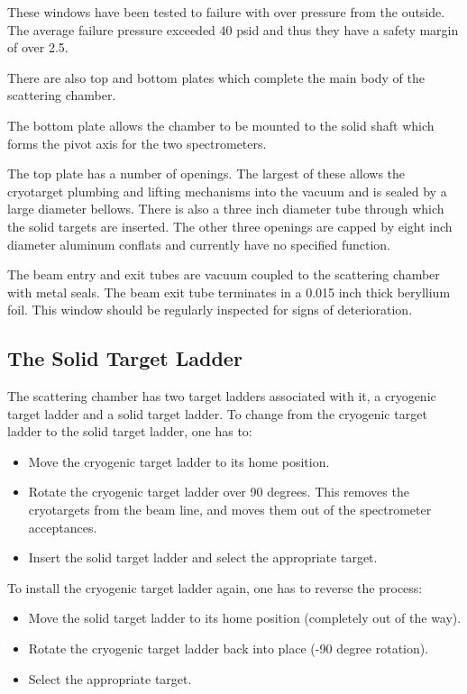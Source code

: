 These windows have been tested to failure with over pressure from the
outside.  The average failure pressure exceeded 40 psid and thus they
have a safety margin of over 2.5.  

There are also top and bottom plates which complete the main body of the
scattering chamber.

The bottom plate allows the chamber to be mounted to the
solid shaft which forms the pivot axis for the two spectrometers.


The top plate has a number of openings. The largest of these allows
the cryotarget plumbing and lifting mechanisms into the vacuum and is sealed by
a large diameter bellows. There is also a three inch diameter tube through
which the solid targets are inserted.
The other three openings are capped by eight inch diameter aluminum
conflats and currently have no specified function.

The beam entry and exit tubes are vacuum coupled to the scattering chamber with
metal seals. The beam exit tube terminates in a 0.015 inch thick beryllium foil.
This window should be regularly inspected for signs of deterioration.


\subsection{The Solid Target Ladder}

The scattering chamber has two target ladders associated with it,
a cryogenic target ladder and a solid target ladder. To change
from the cryogenic target ladder to the solid target ladder, one has
to:

\begin{itemize}
\item{Move the cryogenic target ladder to its home position.}
\item{Rotate the cryogenic target ladder over 90 degrees. This removes
the cryotargets from the beam line, and moves them out of the spectrometer
acceptances.}
\item{Insert the solid target ladder and select the appropriate target.}
\end{itemize}

\noindent To install the cryogenic target ladder again, one has to reverse the
process:

\begin{itemize}
\item{Move the solid target ladder to its home position (completely out
of the way).}
\item{Rotate the cryogenic target ladder back into place (-90 degree
rotation).}
\item{Select the appropriate target.}
\end{itemize}

